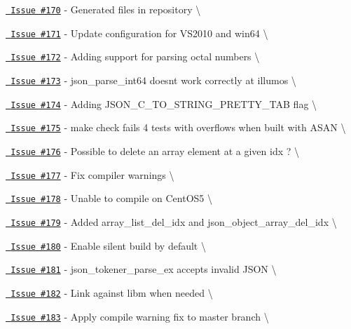 \begin{DoxyItemize}
\item \href{https://github.com/json-c/json-c/issues/170}{\texttt{ Issue \#170}} -\/ Generated files in repository \textbackslash{}
\item \href{https://github.com/json-c/json-c/issues/171}{\texttt{ Issue \#171}} -\/ Update configuration for VS2010 and win64 \textbackslash{}
\item \href{https://github.com/json-c/json-c/issues/172}{\texttt{ Issue \#172}} -\/ Adding support for parsing octal numbers \textbackslash{}
\item \href{https://github.com/json-c/json-c/issues/173}{\texttt{ Issue \#173}} -\/ json\+\_\+parse\+\_\+int64 doesn\textquotesingle{}t work correctly at illumos \textbackslash{}
\item \href{https://github.com/json-c/json-c/issues/174}{\texttt{ Issue \#174}} -\/ Adding JSON\+\_\+\+C\+\_\+\+TO\+\_\+\+STRING\+\_\+\+PRETTY\+\_\+\+TAB flag \textbackslash{}
\item \href{https://github.com/json-c/json-c/issues/175}{\texttt{ Issue \#175}} -\/ make check fails 4 tests with overflows when built with ASAN \textbackslash{}
\item \href{https://github.com/json-c/json-c/issues/176}{\texttt{ Issue \#176}} -\/ Possible to delete an array element at a given idx ? \textbackslash{}
\item \href{https://github.com/json-c/json-c/issues/177}{\texttt{ Issue \#177}} -\/ Fix compiler warnings \textbackslash{}
\item \href{https://github.com/json-c/json-c/issues/178}{\texttt{ Issue \#178}} -\/ Unable to compile on Cent\+OS5 \textbackslash{}
\item \href{https://github.com/json-c/json-c/issues/179}{\texttt{ Issue \#179}} -\/ Added array\+\_\+list\+\_\+del\+\_\+idx and json\+\_\+object\+\_\+array\+\_\+del\+\_\+idx \textbackslash{}
\item \href{https://github.com/json-c/json-c/issues/180}{\texttt{ Issue \#180}} -\/ Enable silent build by default \textbackslash{}
\item \href{https://github.com/json-c/json-c/issues/181}{\texttt{ Issue \#181}} -\/ json\+\_\+tokener\+\_\+parse\+\_\+ex accepts invalid JSON \textbackslash{}
\item \href{https://github.com/json-c/json-c/issues/182}{\texttt{ Issue \#182}} -\/ Link against libm when needed \textbackslash{}
\item \href{https://github.com/json-c/json-c/issues/183}{\texttt{ Issue \#183}} -\/ Apply compile warning fix to master branch \textbackslash{}

\end{DoxyItemize}
